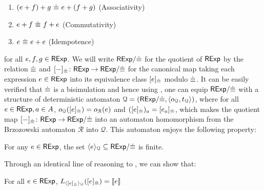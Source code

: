 \begin{enumerate}
	\item $ {{(e + f) + g} {~{\mathrel{\dot\equiv}}~} {e + (f+g)}}$ (Associativity)
	\item ${e + f} {~{\mathrel{\dot\equiv}}~} {f + e}$ (Commutativity)
	\item ${e} {~{\mathrel{\dot\equiv}}~} {e + e}$ (Idempotence) 
\end{enumerate}
	 for all $e,f,g \in \mathsf{RExp}$. 
We will write ${{\mathsf{RExp}}/{{\mathrel{\dot\equiv}}}}$ for the quotient of $\mathsf{RExp}$ by the relation ${\mathrel{\dot\equiv}}$ and $[-]_{{\mathrel{\dot\equiv}}} \colon \mathsf{RExp} \to {\mathsf{RExp}}/{{\mathrel{\dot\equiv}}}$ for the canonical map taking each expression $e \in \mathsf{RExp}$ into its equivalence class $[e]_{{\mathrel{\dot\equiv}}}$ modulo ${\mathrel{\dot\equiv}}$. It can be easily verified that ${\mathrel{\dot\equiv}}$ is a bisimulation and hence using , one can equip ${\mathsf{RExp}}/{{\mathrel{\dot\equiv}}}$ with a structure of deterministic automaton $\mathcal{Q} = ({\mathsf{RExp}}/{{\mathrel{\dot\equiv}}}, \langle o_{\mathcal{Q}}, t_{\mathcal{Q}} \rangle)$, where for all $e \in \mathsf{RExp}, a \in {A}$, $o_{\mathcal{Q}}([e]_{{\mathrel{\dot\equiv}}})=o_{\mathcal{R}}(e)$ and $([e]_{{\mathrel{\dot\equiv}}})_a = [e_a]_{{\mathrel{\dot\equiv}}}$, which makes the quotient map $[-]_{{\mathrel{\dot\equiv}}} \colon \mathsf{RExp} 
\to {\mathsf{RExp}}/{{\mathrel{\dot\equiv}}}$ into an automaton homomorphism from the Brzozowski automaton $\mathcal{R}$ into $\mathcal{Q}$. This automaton enjoys the following property:
\begin{lemma}\label{c2:lem:locally_finite}
    For any $e \in \mathsf{RExp}$, the set $\langle e \rangle_{\mathcal{Q}} \subseteq {\mathsf{RExp}}/{{\mathrel{\dot\equiv}}}$ is finite.
\end{lemma}
Through an identical line of reasoning to , we can show that:
\begin{lemma}
	For all $e \in \mathsf{RExp}$, $L_{\langle [e]_{{\mathrel{\dot\equiv}}} \rangle_{\mathcal{Q}}}([e]_{{\mathrel{\dot\equiv}}}) = \left\llbracket{e}\right\rrbracket$
\end{lemma}
